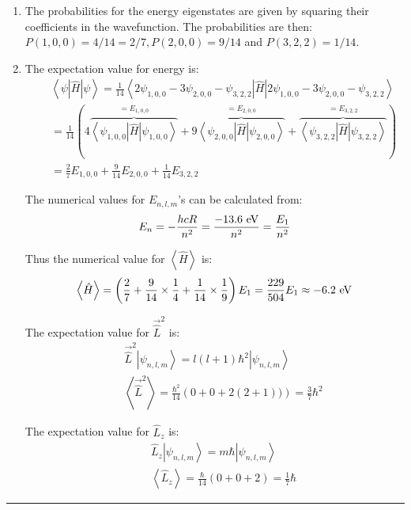 \begin{enumerate}
\item The probabilities for the energy eigenstates are given by squaring their coefficients in the wavefunction. The probabilities are then: $P(1,0,0) = 4/14 = 2 / 7, P(2,0,0) = 9/14$ and $P(3,2,2) = 1/ 14$.
\item The expectation value for energy is:
\begin{eqnarray}
\nonumber
& & \left<\psi\left|\hat{H}\right|\psi\right> = \frac{1}{14}\left<2\psi_{1,0,0} - 3\psi_{2,0,0} - \psi_{3,2,2}\left|\hat{H}\right|2\psi_{1,0,0} - 3\psi_{2,0,0} - \psi_{3,2,2}\right>\\
\nonumber
& & = \frac{1}{14}\left(4\overbrace{\left<\psi_{1,0,0}\left|\hat{H}\right|\psi_{1,0,0}\right>}^{=E_{1,0,0}} + 9\overbrace{\left<\psi_{2,0,0}\left|\hat{H}\right|\psi_{2,0,0}\right>}^{= E_{2,0,0}} + \overbrace{\left<\psi_{3,2,2}\left|\hat{H}\right|\psi_{3,2,2}\right>}^{=E_{3,2,2}}\right)\\
\nonumber
& & = \frac{2}{7}E_{1,0,0} + \frac{9}{14}E_{2,0,0} + \frac{1}{14}E_{3,2,2}
\end{eqnarray}

The numerical values for $E_{n,l,m}$'s can be calculated from:
$$E_n = -\frac{hcR}{n^2} = \frac{-13.6\textnormal{ eV}}{n^2} = \frac{E_1}{n^2}$$

Thus the numerical value for $\left<\hat{H}\right>$ is:
$$\left<\hat{H}\right> = \left(\frac{2}{7} + \frac{9}{14}\times\frac{1}{4} + \frac{1}{14}\times\frac{1}{9}\right)E_1 = \frac{229}{504}E_1\approx -6.2\textnormal{ eV}$$

The expectation value for $\vec{\hat{L}}^2$ is:
\begin{eqnarray}
\nonumber
& & \vec{\hat{L}}^2\left|\psi_{n,l,m}\right> = l(l + 1)\hbar^2\left|\psi_{n,l,m}\right>\\
\nonumber
& & \left<\vec{\hat{L}}^2\right> = \frac{\hbar^2}{14}\left(0 + 0 + 2(2 + 1))\right) = \frac{3}{7}\hbar^2
\end{eqnarray}

The expectation value for $\hat{L}_z$ is:
\begin{eqnarray}
\nonumber
& & \hat{L}_z\left|\psi_{n,l,m}\right> = m\hbar\left|\psi_{n,l,m}\right>\\
\nonumber
& & \left<\hat{L}_z\right> = \frac{\hbar}{14}(0 + 0 + 2) = \frac{1}{7}\hbar
\end{eqnarray}

\end{enumerate}

\hrule\vspace{0.5cm}
